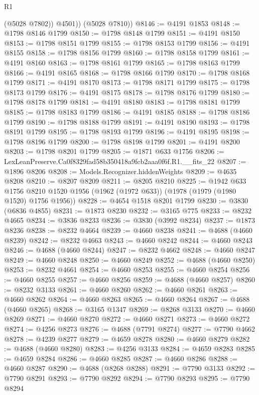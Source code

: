 \begin{lexlean}{R1}
\begin{coremodule}
            (@5028 @7802))
          @4501))
      (@5028 @7810))
@8146 := @4191 @1853
@8148 := @1798 @8146 @1799
@8150 := @1798 @8148 @1799
@8151 := @4191 @8150
@8153 := @1798 @8151 @1799
@8155 := @1798 @8153 @1799
@8156 := @4191 @8155
@8158 := @1798 @8156 @1799
@8160 := @1798 @8158 @1799
@8161 := @4191 @8160
@8163 := @1798 @8161 @1799
@8165 := @1798 @8163 @1799
@8166 := @4191 @8165
@8168 := @1798 @8166 @1799
@8170 := @1798 @8168 @1799
@8171 := @4191 @8170
@8173 := @1798 @8171 @1799
@8175 := @1798 @8173 @1799
@8176 := @4191 @8175
@8178 := @1798 @8176 @1799
@8180 := @1798 @8178 @1799
@8181 := @4191 @8180
@8183 := @1798 @8181 @1799
@8185 := @1798 @8183 @1799
@8186 := @4191 @8185
@8188 := @1798 @8186 @1799
@8190 := @1798 @8188 @1799
@8191 := @4191 @8190
@8193 := @1798 @8191 @1799
@8195 := @1798 @8193 @1799
@8196 := @4191 @8195
@8198 := @1798 @8196 @1799
@8200 := @1798 @8198 @1799
@8201 := @4191 @8200
@8203 := @1798 @8201 @1799
@8205 := @1871 @633 @1756
@8206 := LexLeanPreserve.Ca0f8329fad58b350418a9fcb2aaa0f6f.R1.__fits_22
@8207 := @1896 @8206
@8208 := Models.Recognizer.hiddenWeights
@8209 := @4635 @8208
@8210 := @8207 @8209
@8211 := @8205 @8210
@8225 := @1942
    @633
    @1756
    @8210
    @1520
    @1956
    (@1962 (@1972 @633))
    (@1978 (@1979 (@1980 @1520) @1756 @1956))
@8228 := @4654 @1518 @8201 @1799
@8230 := @3830 (@6836 @4855)
@8231 := @1873 @8230
@8232 := @3165 @775
@8233 := @8232 @4665
@8234 := @3836 @8233
@8236 := @3830 (@3992 @8234)
@8237 := @1873 @8236
@8238 := @8232 @4664
@8239 := @4660 @8238
@8241 := @4688 (@4660 @8239)
@8242 := @8232 @4663
@8243 := @4660 @8242
@8244 := @4660 @8243
@8246 := @4688 (@4660 @8244)
@8247 := @8232 @4662
@8248 := @4660 @8247
@8249 := @4660 @8248
@8250 := @4660 @8249
@8252 := @4688 (@4660 @8250)
@8253 := @8232 @4661
@8254 := @4660 @8253
@8255 := @4660 @8254
@8256 := @4660 @8255
@8257 := @4660 @8256
@8259 := @4688 (@4660 @8257)
@8260 := @8232 @3133
@8261 := @4660 @8260
@8262 := @4660 @8261
@8263 := @4660 @8262
@8264 := @4660 @8263
@8265 := @4660 @8264
@8267 := @4688 (@4660 @8265)
@8268 := @3165 @1347
@8269 := @8268 @3133
@8270 := @4660 @8269
@8271 := @4660 @8270
@8272 := @4660 @8271
@8273 := @4660 @8272
@8274 := @4256 @8273
@8276 := @4688 (@7791 @8274)
@8277 := @7790 @4662
@8278 := @4239 @8277
@8279 := @4659 @8278
@8280 := @4660 @8279
@8282 := @4688 (@4660 @8280)
@8283 := @4256 @3133
@8284 := @4659 @8283
@8285 := @4659 @8284
@8286 := @4660 @8285
@8287 := @4660 @8286
@8288 := @4660 @8287
@8290 := @4688 (@8268 @8288)
@8291 := @7790 @3133
@8292 := @7790 @8291
@8293 := @7790 @8292
@8294 := @7790 @8293
@8295 := @7790 @8294

\end{coremodule}
\end{lexlean}
